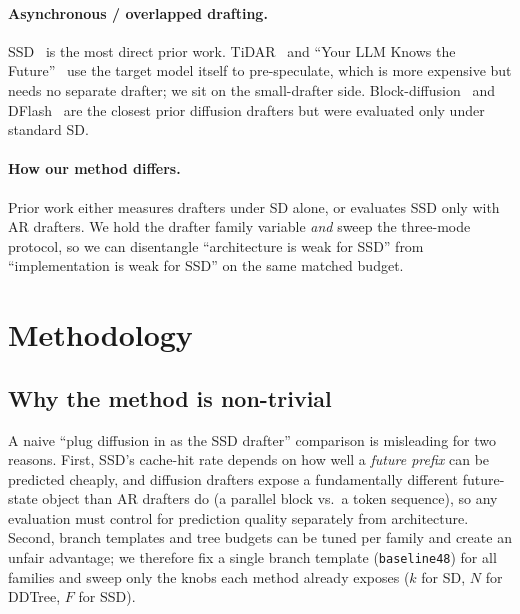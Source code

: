 \documentclass{article}
\begin{document}
\paragraph{Asynchronous / overlapped drafting.}
SSD~\citep{kumar2026ssd} is the most direct prior work.
TiDAR~\citep{tidar2025} and ``Your LLM Knows the Future''~\citep{sun2024ytllmfuture} use the target model itself to pre-speculate, which is more expensive but needs no separate drafter; we sit on the small-drafter side.
Block-diffusion~\citep{arriola2024blockdiffusion} and DFlash~\citep{dflash2025} are the closest prior diffusion drafters but were evaluated only under standard SD.

\paragraph{How our method differs.}
Prior work either measures drafters under SD alone, or evaluates SSD only with AR drafters.
We hold the drafter family variable \emph{and} sweep the three-mode protocol, so we can disentangle ``architecture is weak for SSD'' from ``implementation is weak for SSD'' on the same matched budget.

\section{Methodology}
\label{sec:method}

\subsection{Why the method is non-trivial}
A naive ``plug diffusion in as the SSD drafter'' comparison is misleading for two reasons.
First, SSD's cache-hit rate depends on how well a \emph{future prefix} can be predicted cheaply, and diffusion drafters expose a fundamentally different future-state object than AR drafters do (a parallel block vs.\ a token sequence), so any evaluation must control for prediction quality separately from architecture.
Second, branch templates and tree budgets can be tuned per family and create an unfair advantage; we therefore fix a single branch template (\texttt{baseline48}) for all families and sweep only the knobs each method already exposes ($k$ for SD, $N$ for DDTree, $F$ for SSD).
\end{document}
